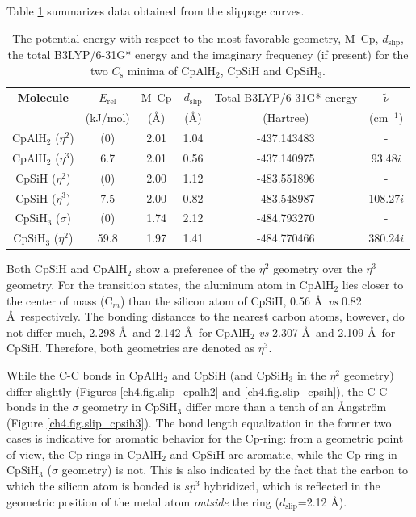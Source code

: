 Table \ref{ch4.tab.slip} summarizes data obtained from the slippage curves.
\begin{table}[htbp]
\center
\caption{The potential energy with respect to the most favorable geometry, M--Cp, $d_\mathrm{slip}$, the total B3LYP/6-31G* energy and the imaginary frequency (if present) for the two $C_\mathrm{s}$ minima of CpAlH$_2$, CpSiH and CpSiH$_3$.}
\begin{tabular}{|c|c|c|c|c|c|}
\hline
\textbf{Molecule}&
$E_\mathrm{rel}$&
M--Cp&
$d_\mathrm{slip}$&Total B3LYP/6-31G* energy&
$\tilde{\nu}$\\
&(kJ/mol)&(\AA)&(\AA)&(Hartree)& (cm$^{-1}$)\\
\hline
CpAlH$_2$ ($\eta^{2}$) & (0)  & 2.01 & 1.04 & -437.143483 & -\\
CpAlH$_2$ ($\eta^{3}$) & 6.7  & 2.01 & 0.56 & -437.140975 & 93.48$i$ \\
CpSiH ($\eta^{2}$) & (0)  & 2.00 & 1.12 & -483.551896 & -\\
CpSiH ($\eta^{3}$) & 7.5  & 2.00 & 0.82 & -483.548987 & 108.27$i$ \\
CpSiH$_3$ ($\sigma$) & (0)  & 1.74 & 2.12 & -484.793270 & - \\
CpSiH$_3$ ($\eta^{2}$) & 59.8 & 1.97 & 1.41 & -484.770466 & 380.24$i$ \\
\hline
\end{tabular}
\label{ch4.tab.slip}
\end{table}
Both CpSiH and CpAlH$_2$ show a preference of the $\eta^{2}$ geometry over the $\eta^{3}$ geometry. For the transition states, the aluminum atom in CpAlH$_2$ lies closer to the center of mass (C$_m$) than the silicon atom of CpSiH, 0.56 \AA\ \textit{vs} 0.82 \AA\ respectively. The bonding distances to the nearest carbon atoms, however, do not differ much, 2.298 \AA\ and 2.142 \AA\ for CpAlH$_2$ \textit{vs} 2.307 \AA\ and 2.109 \AA\ for CpSiH. Therefore, both geometries are denoted as $\eta^{3}$.

While the C-C bonds in CpAlH$_2$ and CpSiH (and CpSiH$_3$ in the $\eta^2$ geometry) differ slightly (Figures \ref{ch4.fig.slip_cpalh2} and \ref{ch4.fig.slip_cpsih}), the C-C bonds in the $\sigma$ geometry in CpSiH$_3$ differ more than a tenth of an \AA ngstr\"{o}m (Figure \ref{ch4.fig.slip_cpsih3}). The bond length equalization in the former two cases is indicative for aromatic behavior for the Cp-ring: from a geometric point of view, the Cp-rings in CpAlH$_2$ and CpSiH are aromatic, while the Cp-ring in CpSiH$_3$ ($\sigma$ geometry) is not. This is also indicated by the fact that the carbon to which the silicon atom is bonded is $sp^3$ hybridized, which is reflected in the geometric position of the metal atom \textit{outside} the ring ($d_\mathrm{slip}$=2.12 \AA). 

